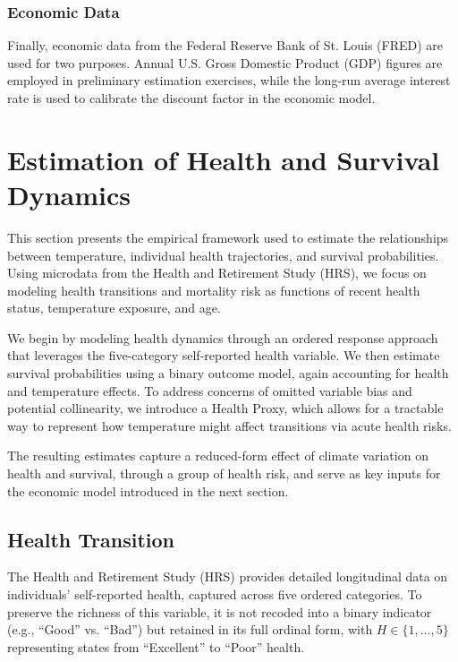 \documentclass{article}
\begin{document}
\subsubsection{Economic Data}

Finally, economic data from the Federal Reserve Bank of St. Louis (FRED) are used for two purposes. 
Annual U.S. Gross Domestic Product (GDP) figures are employed in preliminary estimation exercises, 
while the long-run average interest rate is used to calibrate the discount factor in the economic model.

\section{Estimation of Health and Survival Dynamics}

This section presents the empirical framework used to estimate
the relationships between temperature,
individual health trajectories, and survival probabilities.
Using microdata from the Health and Retirement Study (HRS),
we focus on modeling health transitions and mortality risk
as functions of recent health status, temperature exposure, and age.

We begin by modeling health dynamics through an ordered response approach that
leverages the five-category self-reported health variable.
We then estimate survival probabilities using a binary outcome model,
again accounting for health and temperature effects.
To address concerns of omitted variable bias and potential collinearity, 
we introduce a Health Proxy, which allows for a tractable way to represent how
temperature might affect transitions via acute health risks. 

The resulting estimates capture a reduced-form
effect of climate variation on health and survival,
through a group of health risk,
and serve as key inputs for the economic
model introduced in the next section.

\subsection{Health Transition}

The Health and Retirement Study (HRS) provides detailed longitudinal data on individuals’ self-reported health, captured across five ordered categories.
To preserve the richness of this variable, it is not recoded into a binary indicator (e.g., “Good” vs. “Bad”) but retained in its full ordinal form, with $H \in \{1,\dots,5\}$ representing states from “Excellent” to “Poor” health.
\end{document}
